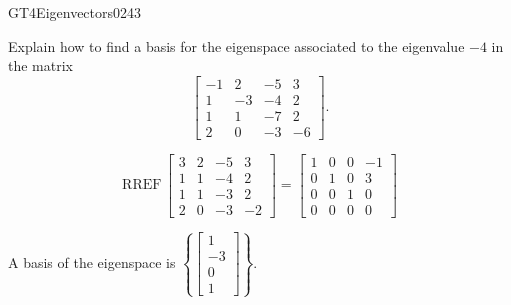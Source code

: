 \begin{exercise}{GT4}{Eigenvectors}{0243} 
\begin{exerciseStatement} 

Explain how to find a basis for the eigenspace associated to the eigenvalue \(-4\) in the matrix \[\left[\begin{array}{cccc}
-1 & 2 & -5 & 3 \\
1 & -3 & -4 & 2 \\
1 & 1 & -7 & 2 \\
2 & 0 & -3 & -6
\end{array}\right].\]

 \end{exerciseStatement}
 \begin{exerciseAnswer} 

\[\mathrm{RREF}\,\left[\begin{array}{cccc}
3 & 2 & -5 & 3 \\
1 & 1 & -4 & 2 \\
1 & 1 & -3 & 2 \\
2 & 0 & -3 & -2
\end{array}\right]=\left[\begin{array}{cccc}
1 & 0 & 0 & -1 \\
0 & 1 & 0 & 3 \\
0 & 0 & 1 & 0 \\
0 & 0 & 0 & 0
\end{array}\right]\]

 

A basis of the eigenspace is \(\left\{ \left[\begin{array}{c}
1 \\
-3 \\
0 \\
1
\end{array}\right] \right\}\).

 \end{exerciseAnswer}
 \end{exercise}



